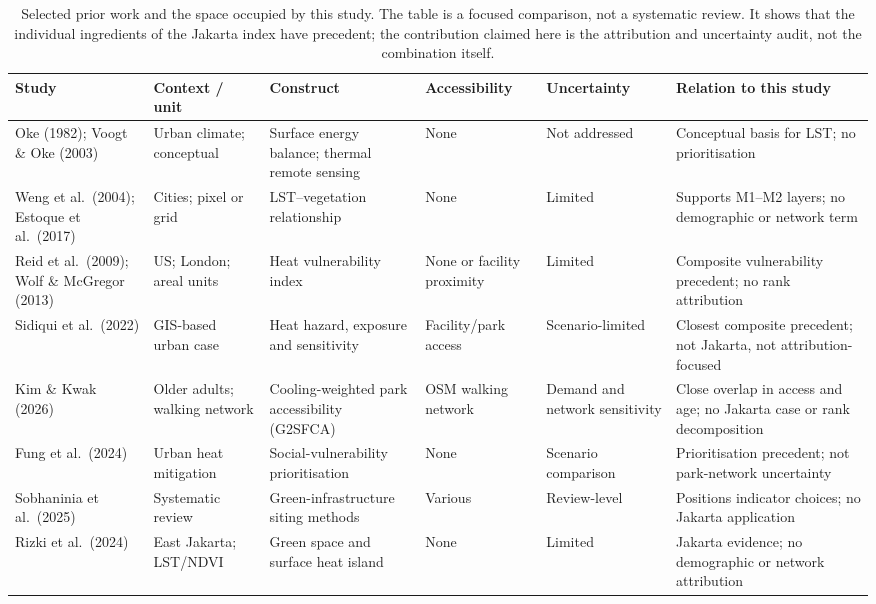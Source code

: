 \begin{table}[htbp]
\centering
\footnotesize
\caption{Selected prior work and the space occupied by this study. The table is a
focused comparison, not a systematic review. It shows that the individual
ingredients of the Jakarta index have precedent; the contribution claimed here is
the attribution and uncertainty audit, not the combination itself.}
\label{tab:literature}
\begin{threeparttable}
\begin{tabularx}{\textwidth}{@{}>{\raggedright\arraybackslash}p{2.45cm}
>{\raggedright\arraybackslash}p{2.3cm}
>{\raggedright\arraybackslash}p{2.5cm}
>{\raggedright\arraybackslash}p{2.0cm}
>{\raggedright\arraybackslash}p{2.1cm}
>{\raggedright\arraybackslash}X@{}}
\toprule
Study & Context / unit & Construct & Accessibility & Uncertainty & Relation to this study \\
\midrule
Oke (1982); Voogt \& Oke (2003) & Urban climate; conceptual & Surface energy balance; thermal remote sensing & None & Not addressed & Conceptual basis for LST; no prioritisation \\
Weng et al.\ (2004); Estoque et al.\ (2017) & Cities; pixel or grid & LST--vegetation relationship & None & Limited & Supports M1--M2 layers; no demographic or network term \\
Reid et al.\ (2009); Wolf \& McGregor (2013) & US; London; areal units & Heat vulnerability index & None or facility proximity & Limited & Composite vulnerability precedent; no rank attribution \\
Sidiqui et al.\ (2022) & GIS-based urban case & Heat hazard, exposure and sensitivity & Facility/park access & Scenario-limited & Closest composite precedent; not Jakarta, not attribution-focused \\
Kim \& Kwak (2026) & Older adults; walking network & Cooling-weighted park accessibility (G2SFCA) & OSM walking network & Demand and network sensitivity & Close overlap in access and age; no Jakarta case or rank decomposition \\
Fung et al.\ (2024) & Urban heat mitigation & Social-vulnerability prioritisation & None & Scenario comparison & Prioritisation precedent; not park-network uncertainty \\
Sobhaninia et al.\ (2025) & Systematic review & Green-infrastructure siting methods & Various & Review-level & Positions indicator choices; no Jakarta application \\
Rizki et al.\ (2024) & East Jakarta; LST/NDVI & Green space and surface heat island & None & Limited & Jakarta evidence; no demographic or network attribution \\

\end{tabularx}
\end{threeparttable}
\end{table}
